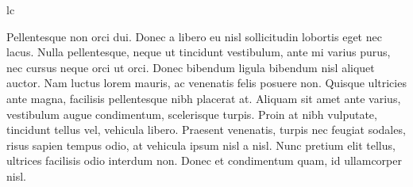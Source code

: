 \documentclass{article}
\begin{document}
lc
\newpage
{}
\beginnumbering

\pstart
Pellentesque non orci dui. Donec a libero eu nisl sollicitudin lobortis eget nec lacus. Nulla pellentesque, neque ut tincidunt vestibulum, ante mi varius purus, nec cursus neque orci ut orci. Donec bibendum ligula bibendum nisl aliquet auctor. Nam luctus lorem mauris, ac venenatis felis posuere non. Quisque ultricies ante magna, facilisis pellentesque nibh placerat at. Aliquam sit amet ante varius, vestibulum augue condimentum, scelerisque turpis. Proin at nibh vulputate, tincidunt tellus vel, vehicula libero. Praesent venenatis, turpis nec feugiat sodales, risus sapien tempus odio, at vehicula ipsum nisl a nisl. Nunc pretium elit tellus, ultrices facilisis odio interdum non. Donec et condimentum quam, id ullamcorper nisl.
\pend

\printindex
\end{document}
